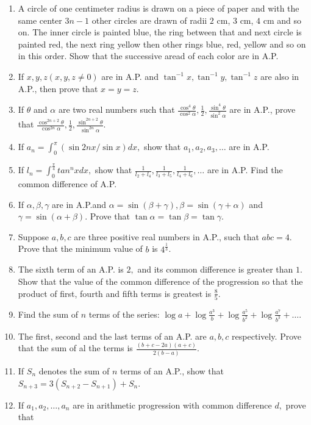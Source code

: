 \begin{enumerate}
\item A circle of one centimeter radius is drawn on a piece of paper and with the same center $3n - 1$ other circles are
  drawn of radii $2$ cm, $3$ cm, $4$ cm and so on. The inner circle is painted blue, the ring between that and next circle is
  painted red, the next ring yellow then other rings blue, red, yellow and so on in this order. Show that the successive aread of
  each color are in A.P.
\item If $x, y, z(x, y, z\neq 0)$ are in A.P. and $\tan^{-1}x, \tan^{-1}y, \tan^{-1}z$ are also in A.P., then prove that
  $x = y = z$.
\item If $\theta$ and $\alpha$ are two real numbers such that $\frac{\cos^4\theta}{\cos^2\alpha}, \frac{1}{2},
  \frac{\sin^4\theta}{\sin^2\alpha}$ are in A.P., prove that $\frac{\cos^{2n + 2}\theta}{\cos^{2n}\alpha}, \frac{1}{2},
  \frac{\sin^{2n + 2}\theta}{\sin^{2n}\alpha}$.
\item If $a_n = \displaystyle\int_0^\pi (\sin 2nx/\sin x)dx,$ show that $a_1, a_2, a_3, \ldots$ are in A.P.
\item If $l_n = \displaystyle\int_0^{\frac{\pi}{4}}tan^nxdx,$ show that $\frac{1}{l_2 + l_4}, \frac{1}{l_3 + l_5}, \frac{1}{l_4 + l_6},
  \ldots$ are in A.P. Find the common difference of A.P.
\item If $\alpha, \beta, \gamma$ are in A.P.and $\alpha = \sin(\beta + \gamma), \beta = \sin(\gamma + \alpha)$ and $\gamma
  = \sin(\alpha + \beta).$ Prove that $\tan \alpha = \tan \beta = \tan \gamma$.
\item Suppose $a, b, c$ are three positive real numbers in A.P., such that $abc = 4.$ Prove that the minimum value of $b$
  is $4^{\frac{1}{3}}$.
\item The sixth term of an A.P. is $2,$ and its common difference is greater than $1.$ Show that the value of the common
  difference of the progression so that the product of first, fourth and fifth terms is greatest is $\frac{8}{5}$.
\item Find the sum of $n$ terms of the series: $\log a + \log\frac{a^3}{b} + \log \frac{a^5}{b^2} + \log \frac{a^7}{b^3} +
  \ldots$.
\item The first, second and the last terms of an A.P. are $a,b, c$ respectively. Prove that the sum of al the terms is
  $\frac{(b + c - 2a)(a + c)}{2(b - a)}$.
\item If $S_n$ denotes the sum of $n$ terms of an A.P., show that $S_{n + 3} = 3(S_{n + 2} - S_{n + 1}) + S_n$.
\item If $a_1, a_2, \ldots, a_n$ are in arithmetic progression with common difference $d,$ prove that

\end{enumerate}
